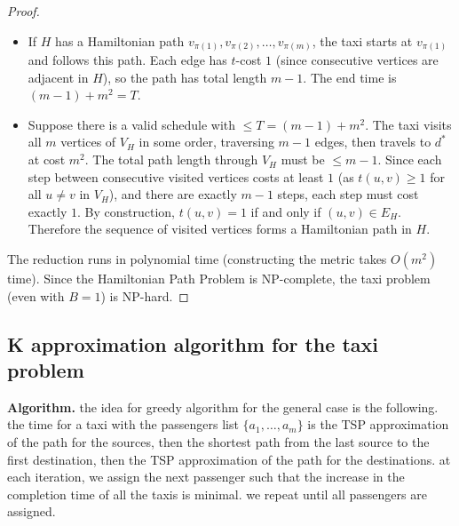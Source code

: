 \begin{proof}
\begin{itemize}
    \item[$(\Rightarrow)$] If $H$ has a Hamiltonian path $v_{\pi(1)}, v_{\pi(2)}, \ldots, v_{\pi(m)}$, the taxi starts at $v_{\pi(1)}$ and follows this path. Each edge has $t$-cost $1$ (since consecutive vertices are adjacent in $H$), so the path has total length $m - 1$. The end time is $(m-1) + m^2 = T$.

    \item[$(\Leftarrow)$] Suppose there is a valid schedule with $\leq T = (m-1) + m^2$. The taxi visits all $m$ vertices of $V_H$ in some order, traversing $m - 1$ edges, then travels to $d^*$ at cost $m^2$. The total path length through $V_H$ must be $\leq m - 1$. Since each step between consecutive visited vertices costs at least $1$ (as $t(u,v) \geq 1$ for all $u \neq v$ in $V_H$), and there are exactly $m - 1$ steps, each step must cost exactly $1$. By construction, $t(u,v) = 1$ if and only if $(u,v) \in E_H$. Therefore the sequence of visited vertices forms a Hamiltonian path in $H$.
\end{itemize}

The reduction runs in polynomial time (constructing the metric takes $O(m^2)$ time). Since the Hamiltonian Path Problem is NP-complete, the taxi problem (even with $B=1$) is NP-hard.
\end{proof}

\subsection*{K approximation algorithm for the taxi problem}
\textbf{Algorithm.} the idea for greedy algorithm for the general case is the following. the time for a taxi with the passengers list $\{a_1, \ldots, a_m\}$ is the TSP approximation of the path for the sources, then the shortest path from the last source to the first destination, then the TSP approximation of the path for the destinations. at each iteration, we assign the next passenger such that the increase in the completion time of all the taxis is minimal. we repeat until all passengers are assigned.

